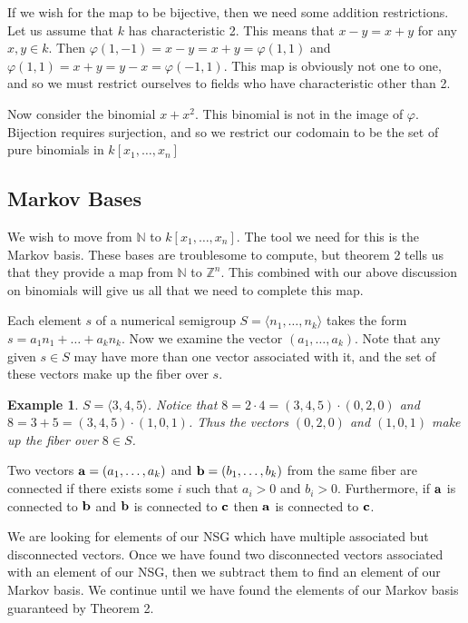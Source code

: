 \documentclass[11pt]{amsart}
\theoremstyle{plain}
\newtheorem{exa}{Example}
\theoremstyle{definition}
\begin{document}
If we wish for the map to be bijective, then we need some addition restrictions. Let us assume that $k$ has characteristic 2. This means that $x-y=x+y$ for any $x,y\in k$. Then $\varphi(1,-1)=x-y=x+y=\varphi(1,1)$ and $\varphi(1,1)=x+y=y-x=\varphi(-1,1)$. This map is obviously not one to one, and so we must restrict ourselves to fields who have characteristic other than 2.

Now consider the binomial $x+x^2$. This binomial is not in the image of $\varphi$. Bijection requires surjection, and so we restrict our codomain to be the set of pure binomials in $k[x_1,\dots,x_n]$

\subsection{Markov Bases}
We wish to move from $\mathbb{N}$ to $k[x_1,\dots,x_n]$. The tool we need for this is the Markov basis. These bases are troublesome to compute, but theorem 2 tells us that they provide a map from $\mathbb{N}$ to $\mathbb{Z}^n$. This combined with our above discussion on binomials will give us all that we need to complete this map.

Each element $s$ of a numerical semigroup $S=\langle n_1,\dots,n_k\rangle$ takes
the form $s=a_1n_1+\dots+a_kn_k$. Now we examine the vector $(a_1,\dots,a_k)$.
Note that any given $s\in S$ may have more than one vector associated with it, and the set of these vectors make up the fiber over $s$.
\begin{exa}
  $S=\langle 3,4,5\rangle$.
  Notice that $8=2\cdot 4=(3,4,5)\cdot(0,2,0)$ and $8=3+5=(3,4,5)\cdot(1,0,1)$.
  Thus the vectors $(0,2,0)$ and $(1,0,1)$ make up the fiber over $8\in S$.
\end{exa}
Two vectors ${\bf a}=(a_1,\dots,a_k)$
and ${\bf b}=(b_1,\dots,b_k)$ from the same fiber are connected if there exists some $i$
such that $a_i>0$ and $b_i>0$. Furthermore, if ${\bf a}$ is connected to
${\bf b}$ and ${\bf b}$ is connected to ${\bf c}$ then ${\bf a}$ is connected to
${\bf c}$.

We are looking for elements of our NSG which have multiple
associated but disconnected vectors. Once we have found two disconnected vectors associated with an
element of our NSG, then we subtract them to find an element
of our Markov basis. We continue until we have found the elements of our Markov
basis guaranteed by Theorem 2.
\end{document}
